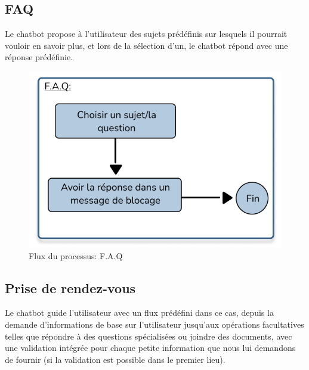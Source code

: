 \subsection{FAQ}

\hspace{16pt}Le chatbot propose à l'utilisateur des sujets prédéfinis sur lesquels il pourrait vouloir en savoir plus, et lors de la sélection d'un, le chatbot répond avec une réponse prédéfinie.

\begin{figure}[H] 
    \centering
    \includegraphics[scale=0.8]{Figures/cbf_faq.png}
    \caption{Flux du processus: F.A.Q}
\end{figure}

\subsection{Prise de rendez-vous}

\hspace{16pt}Le chatbot guide l'utilisateur avec un flux prédéfini dans ce cas, depuis la demande d'informations de base sur l'utilisateur jusqu'aux opérations facultatives telles que répondre à des questions spécialisées ou joindre des documents, avec une validation intégrée pour chaque petite information que nous lui demandons de fournir (si la validation est possible dans le premier lieu).


